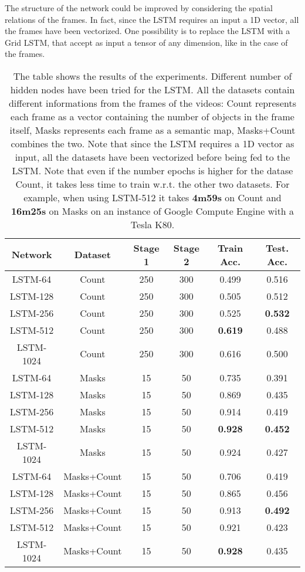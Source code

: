 \documentclass[12pt]{article}
\numberwithin{equation}{section} %
\numberwithin{figure}{section} %
\numberwithin{table}{section} %
\theoremstyle{definition}
\begin{document}
The structure of the network could be improved by considering
the spatial relations of the frames. In fact, since the LSTM
requires an input a 1D vector, all the frames have been
vectorized. One possibility is to replace the LSTM
with a Grid LSTM\cite{Kalchbrenner2015GridLS}, that
accept as input a tensor of any dimension, like in the
case of the frames.

\begin{table}
	\centering
	\begin{tabular}{*{6}{c}}
		Network & Dataset & Stage 1 & Stage 2 & Train Acc. & Test. Acc. \\
		\hline
		LSTM-64 & Count & 250 & 300 & 0.499 & 0.516 \\
		LSTM-128 & Count & 250 & 300 & 0.505 & 0.512 \\
		LSTM-256 & Count & 250 & 300 & 0.525 & \textbf{0.532} \\
		LSTM-512 & Count & 250 & 300 & \textbf{0.619} & 0.488 \\
		LSTM-1024 & Count & 250 & 300 & 0.616 & 0.500 \\
		\hline
		LSTM-64 & Masks & 15 & 50 & 0.735 & 0.391 \\
		LSTM-128 & Masks & 15 & 50 & 0.869 & 0.435 \\
		LSTM-256 & Masks & 15 & 50 & 0.914 & 0.419 \\
		LSTM-512 & Masks & 15 & 50 & \textbf{0.928} & \textbf{0.452} \\
		LSTM-1024 & Masks & 15 & 50 & 0.924 & 0.427 \\
		\hline
		LSTM-64 & Masks+Count & 15 & 50 & 0.706 & 0.419 \\
		LSTM-128 & Masks+Count & 15 & 50 & 0.865 & 0.456 \\
		LSTM-256 & Masks+Count & 15 & 50 & 0.913 & \textbf{0.492} \\
		LSTM-512 & Masks+Count & 15 & 50 & 0.921 & 0.423 \\
		LSTM-1024 & Masks+Count & 15 & 50 & \textbf{0.928} & 0.435 \\
	\end{tabular}
	\caption{The table shows the results of the experiments.
	    Different number of hidden nodes have been tried
	    for the LSTM. All the datasets contain different
	    informations from the frames of the videos:
	    Count represents each frame as a vector containing
	    the number of objects in the frame itself, Masks
	    represents each frame as a semantic map,
	    Masks+Count combines the two. Note that since the
	    LSTM requires a 1D vector as input, all the datasets
	    have been vectorized before being fed to the LSTM.
	    Note that even if the number epochs is higher
	    for the datase Count, it takes less time to train
	    w.r.t. the other two datasets. For example, when
	    using LSTM-512 it takes \textbf{4m59s} on Count and
	    \textbf{16m25s} on Masks on an instance of Google
	    Compute Engine with a Tesla K80.}
    \label{table:lstm-experiments}
\end{table}
\end{document}
